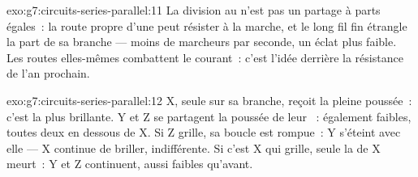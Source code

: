 \begin{solution}{exo:g7:circuits-series-parallel:11}
La division au  n'est pas un partage à parts égales~: la route
propre d'une  peut résister à la marche, et le long fil fin
étrangle la part de sa branche --- moins de marcheurs par seconde, un
éclat plus faible. Les routes elles-mêmes combattent le courant~:
c'est l'idée derrière la résistance de l'an prochain.
\end{solution}

\begin{solution}{exo:g7:circuits-series-parallel:12}
X, seule sur sa branche, reçoit la pleine poussée~: c'est la plus
brillante. Y et Z se partagent  la poussée de leur ~:
également faibles, toutes deux en dessous de X. Si Z grille, sa
boucle est rompue~: Y s'éteint avec elle --- X continue de briller,
indifférente. Si c'est X qui grille, seule la  de X meurt~: Y
et Z continuent, aussi faibles qu'avant.
\end{solution}

